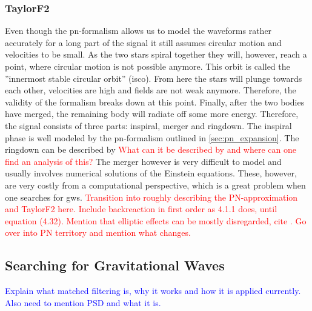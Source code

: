\subsubsection{TaylorF2}
Even though the \gls{pn}-formalism allows us to model the waveforms rather accurately for a long part of the signal it still assumes circular motion and velocities to be small. As the two stars spiral together they will, however, reach a point, where circular motion is not possible anymore. This orbit is called the ''innermost stable circular orbit'' (\gls{isco}). From here the stars will plunge towards each other, velocities are high and fields are not weak anymore. Therefore, the validity of the formalism breaks down at this point. Finally, after the two bodies have merged, the remaining body will radiate off some more energy. Therefore, the signal consists of three parts: inspiral, merger and ringdown. The inspiral phase is well modeled by the \gls{pn}-formalism outlined in \autoref{sec:pn_expansion}. The ringdown can be described by \textcolor{red}{What can it be described by and where can one find an analysis of this?} The merger however is very difficult to model and usually involves numerical solutions of the Einstein equations. These, however, are very costly from a computational perspective, which is a great problem when one searches for \gls{gws}.
\textcolor{red}{Transition into roughly describing the PN-approximation and TaylorF2 here.}
\textcolor{red}{Include backreaction in first order as 4.1.1 \cite{gwv1} does, until equation (4.32). Mention that elliptic effects can be mostly disregarded, cite \cite{gwv1}. Go over into PN territory and mention what changes.}

\subsection{Searching for Gravitational Waves}\label{sec:matched_filtering}
\textcolor{blue}{Explain what matched filtering is, why it works and how it is applied currently. Also need to mention PSD and what it is.}